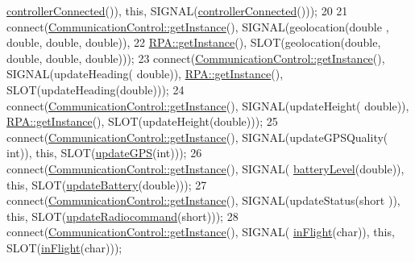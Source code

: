 \begin{DoxyCode}
      \hyperlink{a00010_a35163b56af81dc0f09dc69e92161f4b9}{controllerConnected}()), \textcolor{keyword}{this}, SIGNAL(\hyperlink{a00010_a35163b56af81dc0f09dc69e92161f4b9}{controllerConnected}()));
20 
21     connect(\hyperlink{a00001_afebd43c1f2afd7ec0eb35f99e50f0964}{CommunicationControl::getInstance}(), SIGNAL(geolocation(\textcolor{keywordtype}{double}
      , \textcolor{keywordtype}{double}, \textcolor{keywordtype}{double}, \textcolor{keywordtype}{double})), 
22         \hyperlink{a00012_a40277d38c94caf6125045994ba06f18f}{RPA::getInstance}(), SLOT(geolocation(\textcolor{keywordtype}{double}, \textcolor{keywordtype}{double}, \textcolor{keywordtype}{double}, \textcolor{keywordtype}{double})));
23     connect(\hyperlink{a00001_afebd43c1f2afd7ec0eb35f99e50f0964}{CommunicationControl::getInstance}(), SIGNAL(updateHeading(\textcolor{keywordtype}{
      double})), \hyperlink{a00012_a40277d38c94caf6125045994ba06f18f}{RPA::getInstance}(), SLOT(updateHeading(\textcolor{keywordtype}{double})));
24     connect(\hyperlink{a00001_afebd43c1f2afd7ec0eb35f99e50f0964}{CommunicationControl::getInstance}(), SIGNAL(updateHeight(\textcolor{keywordtype}{
      double})), \hyperlink{a00012_a40277d38c94caf6125045994ba06f18f}{RPA::getInstance}(), SLOT(updateHeight(\textcolor{keywordtype}{double})));
25     connect(\hyperlink{a00001_afebd43c1f2afd7ec0eb35f99e50f0964}{CommunicationControl::getInstance}(), SIGNAL(updateGPSQuality(\textcolor{keywordtype}{
      int})), \textcolor{keyword}{this}, SLOT(\hyperlink{a00010_ae5330168c77c9c4d13fba5b918845ef7}{updateGPS}(\textcolor{keywordtype}{int})));
26     connect(\hyperlink{a00001_afebd43c1f2afd7ec0eb35f99e50f0964}{CommunicationControl::getInstance}(), SIGNAL(
      \hyperlink{a00010_afa417655857cee8564cd3f54b1491e98}{batteryLevel}(\textcolor{keywordtype}{double})), \textcolor{keyword}{this}, SLOT(\hyperlink{a00010_a80fb0b930e406eedf15162edccc726c3}{updateBattery}(\textcolor{keywordtype}{double})));
27     connect(\hyperlink{a00001_afebd43c1f2afd7ec0eb35f99e50f0964}{CommunicationControl::getInstance}(), SIGNAL(updateStatus(\textcolor{keywordtype}{short}
      )), \textcolor{keyword}{this}, SLOT(\hyperlink{a00010_aaf70dd1f6eda48599f92fe2c4426006b}{updateRadiocommand}(\textcolor{keywordtype}{short})));
28     connect(\hyperlink{a00001_afebd43c1f2afd7ec0eb35f99e50f0964}{CommunicationControl::getInstance}(), SIGNAL(
      \hyperlink{a00010_a5f730a9a91784cbf28d39ab22e4d7fec}{inFlight}(\textcolor{keywordtype}{char})), \textcolor{keyword}{this}, SLOT(\hyperlink{a00010_a5f730a9a91784cbf28d39ab22e4d7fec}{inFlight}(\textcolor{keywordtype}{char})));

\end{DoxyCode}
